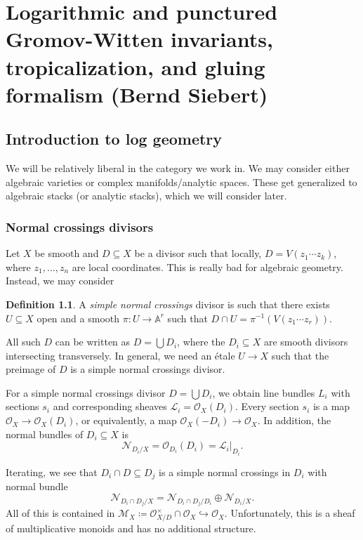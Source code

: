 \documentclass[leqno, openany]{memoir}
\theoremstyle{definition}
\newtheorem{defn}[thm]{Definition}
\theoremstyle{remark}
\theoremstyle{plain}
\theoremstyle{definition}
\theoremstyle{remark}
\newcommand{\A}{\mathbb{A}}
\newcommand{\mc}[1]{\mathcal{#1}}
\begin{document}
\chapter{Logarithmic and punctured Gromov-Witten invariants, tropicalization, and gluing formalism (Bernd Siebert)}%

\section{Introduction to log geometry}

We will be relatively liberal in the category we work in. We may consider either algebraic varieties or complex manifolds/analytic spaces. These get generalized to algebraic stacks (or analytic stacks), which we will consider later.

\subsection{Normal crossings divisors}

Let $X$ be smooth and $D \subseteq X$ be a divisor such that locally, $D = V(z_1 \cdots z_k)$, where $z_1, \ldots, z_n$ are local coordinates. This is really bad for algebraic geometry. Instead, we may consider

\begin{defn}
    A \textit{simple normal crossings} divisor is such that there exists $U \subseteq X$ open and a smooth $\pi \colon U \to \A^r$ such that $D \cap U = \pi^{-1}(V(z_1 \cdots z_r))$.
\end{defn}

All such $D$ can be written as $D = \bigcup D_i$, where the $D_i \subseteq X$ are smooth divisors intersecting transversely. In general, we need an \'etale $U \to X$ such that the preimage of $D$ is a simple normal crossings divisor.

For a simple normal crossings divisor $D = \bigcup D_i$, we obtain line bundles $L_i$ with sections $s_i$ and corresponding sheaves $\mc{L}_i = \mc{O}_X(D_i)$. Every section $s_i$ is a map $\mc{O}_X \to \mc{O}_X(D_i)$, or equivalently, a map $\mc{O}_X(-D_i) \to \mc{O}_X$. In addition, the normal bundles of $D_i \subseteq X$ is
\[ \mc{N}_{D_i/X} = \mc{O}_{D_i}(D_i) = \mc{L}_i |_{D_i}. \]

Iterating, we see that $D_i \cap D \subseteq D_j$ is a simple normal crossings in $D_i$ with normal bundle
\[ \mc{N}_{D_i \cap D_j/X} = \mc{N}_{D_i \cap D_j / D_i} \oplus \mc{N}_{D_i/X}. \]
All of this is contained in $\mc{M}_X \coloneqq \mc{O}_{X/D}^{\times} \cap \mc{O}_X \hookrightarrow \mc{O}_X$. Unfortunately, this is a sheaf of multiplicative monoids and has no additional structure.
\end{document}
